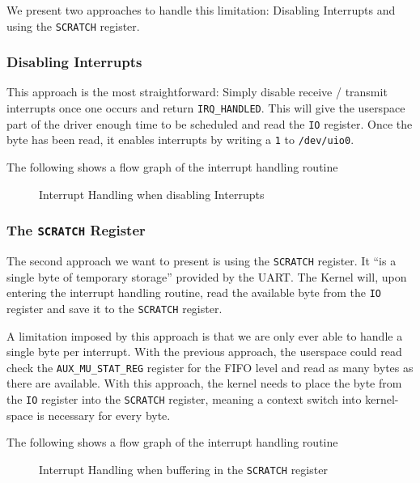 \documentclass[../main.tex]{subfiles}
\begin{document}
    We present two approaches to handle this limitation: Disabling Interrupts and using the \texttt{SCRATCH} register.

    \subsubsection{Disabling Interrupts}
    This approach is the most straightforward: Simply disable receive / transmit interrupts once one occurs and return \texttt{IRQ\_HANDLED}. This will give the userspace part of the driver enough time to be scheduled and read the \texttt{IO} register. Once the byte has been read, it enables interrupts by writing a \texttt{1} to \texttt{/dev/uio0}.

    The following shows a flow graph of the interrupt handling routine
    \begin{figure}[H]
        \centering
        \caption{Interrupt Handling when disabling Interrupts}
        \label{fig:disable-interrupts}
    \end{figure}

    \subsubsection{The \texttt{SCRATCH} Register}
    The second approach we want to present is using the \texttt{SCRATCH} register. It \enquote{is a single byte of temporary storage} provided by the UART. The Kernel will, upon entering the interrupt handling routine, read the available byte from the \texttt{IO} register and save it to the \texttt{SCRATCH} register.

    A limitation imposed by this approach is that we are only ever able to handle a single byte per interrupt. With the previous approach, the userspace could read check the \texttt{AUX\_MU\_STAT\_REG} register for the FIFO level and read as many bytes as there are available. With this approach, the kernel needs to place the byte from the \texttt{IO} register into the \texttt{SCRATCH} register, meaning a context switch into kernel-space is necessary for every byte.

    The following shows a flow graph of the interrupt handling routine
    \begin{figure}[H]
        \centering
        \caption{Interrupt Handling when buffering in the \texttt{SCRATCH} register}
        \label{fig:scratch-register}
    \end{figure}
\end{document}
